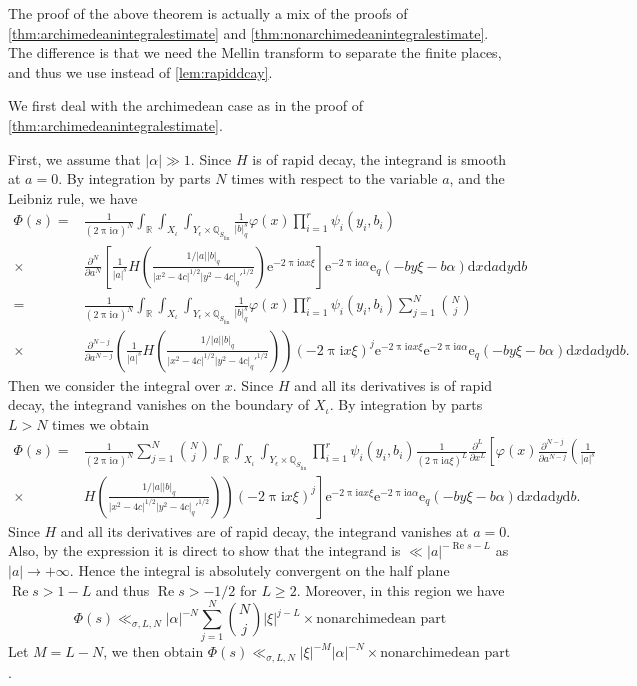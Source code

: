 \documentclass[10pt,oneside,reqno]{amsart}
\makeatletter
\newcommand\rmd{\mathrm{d}}
\newcommand\rme{\mathrm{e}}
\newcommand\rmi{\mathrm{i}}
\newcommand\QQ{\mathbb{Q}}
\newcommand\RR{\mathbb{R}}
\newcommand\dpii{2\uppi\rmi}
\newcommand\diff{\partial}
\renewcommand\Re{\mathop{\mathrm{Re}}}
\newcommand\fin{\mathrm{fin}}
\renewcommand\geq{\geqslant}
\newcommand\legendresymbol[2]{\genfrac{(}{)}{}{}{#1}{#2}}
\theoremstyle{THEOREM}
\theoremstyle{DEFINITION}
\theoremstyle{EXERCISE}
\numberwithin{equation}{section}
\renewenvironment{proof}[1][\proofname]{\par
  \vspace{-6pt}
  \pushQED{\qed}
  \normalfont \topsep6\p@\@plus6\p@\relax
  \trivlist
  \item[\hskip\labelsep\rmfamily\bfseries
    #1\@addpunct{:}]\ignorespaces
}{
  \popQED\endtrivlist\@endpefalse
  \vspace{-6pt}
}
\makeatother
\begin{document}
The proof of the above theorem is actually a mix of the proofs of \autoref{thm:archimedeanintegralestimate} and \autoref{thm:nonarchimedeanintegralestimate}. The difference is that we need the Mellin transform to separate the finite places, and thus we use \cite[Theorem A.5]{cheng2025b} instead of \autoref{lem:rapiddcay}.

\begin{proof}
We first deal with the archimedean case as in the proof of \autoref{thm:archimedeanintegralestimate}. 

First, we assume that $|\alpha|\gg 1$. Since $H$ is of rapid decay, the integrand is smooth at $a=0$. By integration by parts $N$ times with respect to the variable $a$, and the Leibniz rule, we have
\begin{align*}
\Phi(s)=&\frac{1}{(\dpii\alpha)^N}\int_{\RR}\int_{X_\iota}\int_{Y_\epsilon\times \QQ_{S_\fin}}\frac{1}{|b|_q^s}\varphi(x)\prod_{i=1}^{r}\psi_{i}(y_i,b_i)\\
\times&\frac{\diff^N}{\diff a^N}\left[\frac{1}{|a|^s}H\legendresymbol{1/|a||b|_q}{|x^2-4c|^{1/2}|y^2-4c|_q'^{1/2}}\rme^{-\dpii ax\xi}\right]\rme^{-\dpii a\alpha}\rme_{q}(-by\xi-b\alpha)\rmd x\rmd a\rmd y\rmd b\\
=&\frac{1}{(\dpii\alpha)^N}\int_{\RR}\int_{X_\iota}\int_{Y_\epsilon\times \QQ_{S_\fin}}\frac{1}{|b|_q^s}\varphi(x)\prod_{i=1}^{r}\psi_{i}(y_i,b_i)\sum_{j=1}^{N}\binom{N}{j}\\
\times& \frac{\diff^{N-j}}{\diff a^{N-j}}\left(\frac{1}{|a|^s}H\legendresymbol{1/|a||b|_q}{|x^2-4c|^{1/2}|y^2-4c|_q'^{1/2}}\right)(-\dpii x\xi)^j\rme^{-\dpii ax\xi}\rme^{-\dpii a\alpha}\rme_{q}(-by\xi-b\alpha)\rmd x\rmd a\rmd y\rmd b.
\end{align*}
Then we consider the integral over $x$. Since $H$ and all its derivatives is of rapid decay, the integrand vanishes on the boundary of $X_\iota$.
By integration by parts $L>N$ times we obtain
\begin{align*}
\Phi(s)=&\frac{1}{(\dpii\alpha)^N}\sum_{j=1}^{N}\binom{N}{j}\int_{\RR}\int_{X_\iota}\int_{Y_\epsilon\times \QQ_{S_\fin}} \prod_{i=1}^{r}\psi_{i}(y_i,b_i) \frac{1}{(\dpii a\xi)^L}\frac{\diff^{L}}{\diff x^{L}}\left[\varphi(x)\frac{\diff^{N-j}}{\diff a^{N-j}}\left(\frac{1}{|a|^s}\right.\right.\\
\times&\left.\left. H\legendresymbol{1/|a||b|_q}{|x^2-4c|^{1/2}|y^2-4c|_q'^{1/2}}\right)(-\dpii x\xi)^j\right]\rme^{-\dpii ax\xi}\rme^{-\dpii a\alpha}\rme_{q}(-by\xi-b\alpha)\rmd x\rmd a\rmd y\rmd b.
\end{align*}
Since $H$ and all its derivatives are of rapid decay, the integrand vanishes at $a=0$. Also, by the expression it is direct to show that the integrand is $\ll |a|^{-\Re s-L}$ as $|a|\to +\infty$. Hence the integral is absolutely convergent on the half plane $\Re s>1-L$ and thus $\Re s>-1/2$ for $L\geq 2$. Moreover, in this region we have
\[
\Phi(s)\ll_{\sigma,L,N} |\alpha|^{-N}\sum_{j=1}^{N}\binom{N}{j}|\xi|^{j-L}\times\text{nonarchimedean part}
\]
Let $M=L-N$, we then obtain $\Phi(s)\ll_{\sigma,L,N}|\xi|^{-M}|\alpha|^{-N}\times\text{nonarchimedean part}$.


\end{proof}
\end{document}
